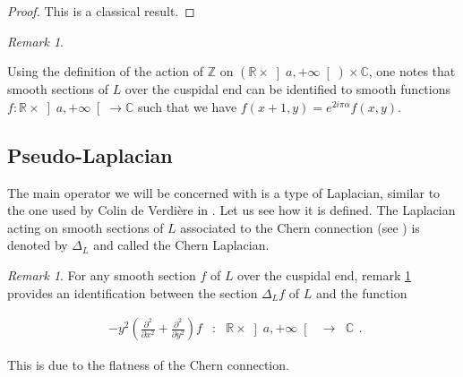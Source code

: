\documentclass{jams-l}
\theoremstyle{definition}
\theoremstyle{remark}
\newtheorem{remark}[theorem]{Remark}
\numberwithin{equation}{section}
\begin{document}
        \begin{proof}
        
            This is a classical result.
        
        \end{proof}
        
        \begin{remark}
        \label{RmkIdentificationSectionFunction}
        
            Using the definition of the action of $\mathbb{Z}$ on $\left( \mathbb{R} \times \left] a, +\infty \right[ \right) \times \mathbb{C}$, one notes that smooth sections of $L$ over the cuspidal end can be identified to smooth functions $f : \mathbb{R} \times \left] a, + \infty \right[ \longrightarrow \mathbb{C}$ such that we have $f \left( x+1, y \right) = e^{2 i \pi \alpha} f \left( x,y \right)$.
        
        \end{remark}
    
    
    \subsection{Pseudo-Laplacian}
    \label{SubSecPseudoLaplacian}
    
        The main operator we will be concerned with is a type of Laplacian, similar to the one used by Colin de Verdière in \cite{MR688031, MR699488}. Let us see how it is defined. The Laplacian acting on smooth sections of $L$ associated to the Chern connection (see \cite[Prop 3.12]{MR2451566}) is denoted by $\Delta_L$ and called the Chern Laplacian.
        
        \begin{remark}
        
            For any smooth section $f$ of $L$ over the cuspidal end, remark \ref{RmkIdentificationSectionFunction} provides an identification between the section $\Delta_L f$ of $L$ and the function
            
            \[ \begin{array}{lllll}
                    -y^2 \left( \frac{\partial^2}{\partial x^2} + \frac{\partial^2}{\partial y^2} \right) f & : & \mathbb{R} \times \left] a,+\infty \right[ & \longrightarrow & \mathbb{C}
                \end{array} . \]
            
            \noindent This is due to the flatness of the Chern connection.
        
        \end{remark}
        
\end{document}
